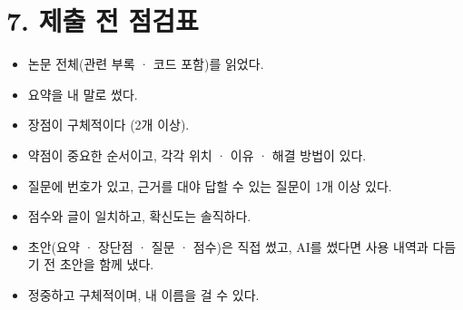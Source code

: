 \documentclass[11pt]{article}
\begin{document}
\section*{7. 제출 전 점검표}
\begin{itemize}
\item[$\square$] 논문 전체(관련 부록 · 코드 포함)를 읽었다.
\item[$\square$] 요약을 내 말로 썼다.
\item[$\square$] 장점이 구체적이다 (2개 이상).
\item[$\square$] 약점이 중요한 순서이고, 각각 위치 · 이유 · 해결 방법이 있다.
\item[$\square$] 질문에 번호가 있고, 근거를 대야 답할 수 있는 질문이 1개 이상 있다.
\item[$\square$] 점수와 글이 일치하고, 확신도는 솔직하다.
\item[$\square$] 초안(요약 · 장단점 · 질문 · 점수)은 직접 썼고, AI를 썼다면 사용 내역과 다듬기 전 초안을 함께 냈다.
\item[$\square$] 정중하고 구체적이며, 내 이름을 걸 수 있다.
\end{itemize}
\end{document}
